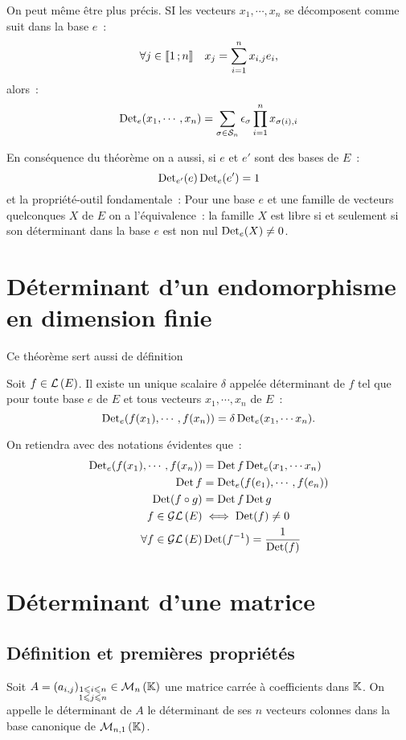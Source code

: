 On peut même être plus précis. SI les vecteurs $x_1, \cdots, x_n$ se décomposent comme suit dans la base $e$~:
\begin{equation}
	\forall j \in \mathopen{\llbracket}1\mathclose{}\mathpunct{};n\mathclose{\rrbracket} \quad x_j = \sum_{i=1}^n x_{i,j}e_i,
\end{equation}
alors~:
\begin{equation}
	\operatorname{Det}_e(x_1, \cdots, x_n) = \sum_{\sigma \in \mathcal{S}_n} \epsilon_\sigma \prod_{i=1}^{n} x_{\sigma(i),i}
\end{equation}

En conséquence du théorème on a aussi, si $e$ et $e'$ sont des bases de $E$~:
\begin{equation}
	\operatorname{Det}_{e'}(e) \operatorname{Det}_{e}(e') = 1
\end{equation}
et la propriété-outil fondamentale~: Pour une base $e$ et une famille de vecteurs quelconques $X$ de $E$ on a l'équivalence~:
la famille $X$ est libre si et seulement si son déterminant dans la base $e$ est non nul $\operatorname{Det}_e(X) \neq 0$.

\section{Déterminant d'un endomorphisme en dimension finie}
Ce théorème sert aussi de définition
\begin{theo}
	Soit $f \in \mathcal{L}\left(E\right)$. Il existe un unique scalaire $\delta$ appelée déterminant de $f$ tel que pour toute base $e$ de $E$ et tous vecteurs $x_1, \cdots, x_n$ de $E$~:
	\begin{equation}
		\operatorname{Det}_e(f(x_1), \cdots, f(x_n)) = \delta \operatorname{Det}_{e}(x_1, \cdots x_n).
	\end{equation}
\end{theo}
On retiendra avec des notations évidentes que~:
\begin{align}
	\operatorname{Det}_e(f(x_1), \cdots, f(x_n)) &= \operatorname{Det} f \operatorname{Det}_e(x_1, \cdots x_n) \\
	\operatorname{Det} f &= \operatorname{Det}_e(f(e_1), \cdots, f(e_n))\\
	\operatorname{Det}(f \circ g) &= \operatorname{Det} f \operatorname{Det} g \\
	f \in \mathcal{GL}\left(E\right) &\iff \operatorname{Det}(f) \neq 0 \\
	\forall f \in \mathcal{GL}\left(E\right) & \operatorname{Det}(f^{-1}) = \frac{1}{\operatorname{Det}(f)}
\end{align}

\section{Déterminant d'une matrice}
\subsection{Définition et premières propriétés}
\begin{defdef}
	Soit $A = (a_{i,j})_{\substack{1\leqslant i \leqslant n \\ 1 \leqslant j \leqslant n}} \in \mathcal{M}_{n}\left(\mathbb{K}\right)$ une matrice carrée à coefficients dans $\mathbb{K}$. On appelle le déterminant de $A$ le déterminant de ses $n$ vecteurs colonnes dans la base canonique de $\mathcal{M}_{n,1}\left(\mathbb{K}\right)$.
\end{defdef}


